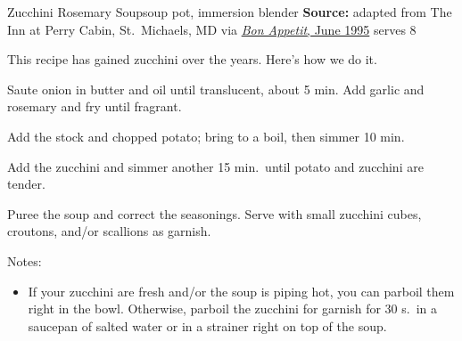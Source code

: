 \begin{recipe}[]{Zucchini Rosemary Soup}{soup pot, immersion blender \hfill }%
 {\textbf{Source:} adapted from The Inn at Perry Cabin, St.\ Michaels, MD via \href{https://www.epicurious.com/recipes/food/views/zucchini-and-rosemary-soup-252}{\textit{Bon Appetit}, June 1995} \hfill serves 8}

 \freeform This recipe has gained zucchini over the years. Here's how we do it.

 Saute onion in butter and oil until translucent, about 5 min. Add garlic and rosemary and fry until fragrant.

 Add the stock and chopped potato; bring to a boil, then simmer 10 min.

 Add the zucchini and simmer another 15 min.\ until potato and zucchini are tender.

 Puree the soup and correct the seasonings. Serve with small zucchini cubes, croutons, and/or scallions as garnish.

 \freeform Notes:
 \begin{itemize}
  \item If your zucchini are fresh and/or the soup is piping hot, you can parboil them right in the bowl. Otherwise, parboil the zucchini for garnish for 30 s.\ in a saucepan of salted water or in a strainer right on top of the soup.
 \end{itemize}
\end{recipe}
